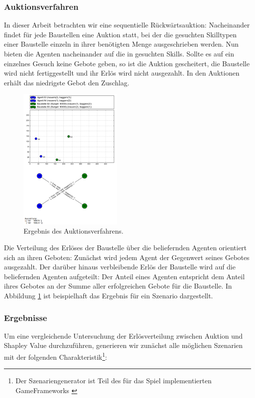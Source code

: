 \subsubsection{Auktionsverfahren}
In dieser Arbeit betrachten wir eine sequentielle Rückwärtsauktion: Nacheinander findet für jede Baustellen eine Auktion statt, bei der die gesuchten Skilltypen einer Baustelle einzeln in ihrer benötigten Menge ausgeschrieben werden. Nun bieten die Agenten nacheinander auf die in gesuchten Skills. Sollte es auf ein einzelnes Gesuch keine Gebote geben, so ist die Auktion gescheitert, die Baustelle wird nicht fertiggestellt und ihr Erlös wird nicht ausgezahlt. In den Auktionen erhält das niedrigste Gebot den Zuschlag.

\begin{figure}
  \centering
  \includegraphics[width=0.45\textwidth]{example-srg.png}
  \caption{Ergebnis des Auktionsverfahrens.}
  \label{example-srg}
\end{figure}

Die Verteilung des Erlöses der Baustelle über die beliefernden Agenten orientiert sich an ihren Geboten: Zunächst wird jedem Agent der Gegenwert seines Gebotes ausgezahlt. Der darüber hinaus verbleibende Erlös der Baustelle wird auf die beliefernden Agenten aufgeteilt: Der Anteil eines Agenten entspricht dem Anteil ihres Gebotes an der Summe aller erfolgreichen Gebote für die Baustelle. In Abbildung \ref{example-srg} ist beispielhaft das Ergebnis für ein Szenario dargestellt.

\subsubsection{Ergebnisse}
Um eine vergleichende Untersuchung der Er\-lös\-ver\-tei\-lung zwischen Auktion und Shapley Value durchzuführen, generieren wir zunächst alle möglichen Szenarien mit der folgenden Charakteristik\footnote{Der Szenariengenerator ist Teil des für das Spiel implementierten GameFrameworks \cite{gitGame}}:


